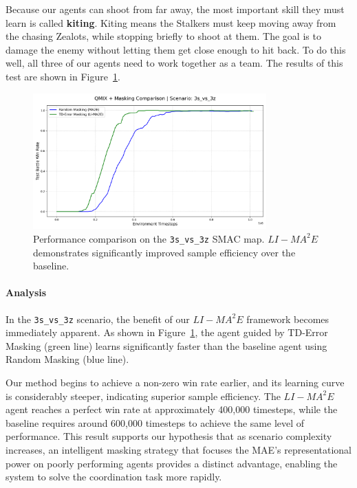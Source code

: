Because our agents can shoot from far away, the most important skill they must learn is called \textbf{kiting}. Kiting means the Stalkers must keep moving away from the chasing Zealots, while stopping briefly to shoot at them. The goal is to damage the enemy without letting them get close enough to hit back. To do this well, all three of our agents need to work together as a team. The results of this test are shown in Figure~\ref{fig:3s_vs_3z}.

\begin{figure}[h]
    \centering
    \includegraphics[width=0.8\textwidth]{images_pfe/results_li-ma2e/comparison_plot_3s_vs_3z.png}
    \caption{Performance comparison on the \texttt{3s\_vs\_3z} SMAC map. $LI-{MA}^2E$ demonstrates significantly improved sample efficiency over the baseline.}
    \label{fig:3s_vs_3z}
\end{figure}

\paragraph{Analysis}
In the \texttt{3s\_vs\_3z} scenario, the benefit of our $LI-{MA}^2E$ framework becomes immediately apparent. As shown in Figure~\ref{fig:3s_vs_3z}, the agent guided by TD-Error Masking (green line) learns significantly faster than the baseline agent using Random Masking (blue line).

Our method begins to achieve a non-zero win rate earlier, and its learning curve is considerably steeper, indicating superior sample efficiency. The $LI-{MA}^2E$ agent reaches a perfect win rate at approximately 400,000 timesteps, while the baseline requires around 600,000 timesteps to achieve the same level of performance. This result supports our hypothesis that as scenario complexity increases, an intelligent masking strategy that focuses the MAE's representational power on poorly performing agents provides a distinct advantage, enabling the system to solve the coordination task more rapidly.

